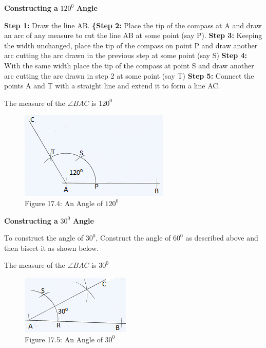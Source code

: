 \documentclass[
  a4paperpaper,
]{scrbook}
\begin{document}
\textbf{Constructing a} \(120^0\) \textbf{Angle}

\textbf{Step 1:} Draw the line AB. \textbf{\{Step 2:} Place the tip of
the compass at A and draw an arc of any measure to cut the line AB at
some point (say P). \textbf{Step 3:} Keeping the width unchanged, place
the tip of the compass on point P and draw another arc cutting the arc
drawn in the previous step at some point (say S) \textbf{Step 4:} With
the same width place the tip of the compass at point S and draw another
arc cutting the arc drawn in step 2 at some point (say T) \textbf{Step
5:} Connect the points A and T with a straight line and extend it to
form a line AC.

The measure of the \(\angle BAC\) is \(120^0\)

\begin{figure}[H]

{\centering \includegraphics{figures/Images/FIG4.png}

}

\caption{Figure 17.4: An Angle of \(120^0\)}

\end{figure}%

\textbf{Constructing a} \(30^0\) \textbf{Angle}

To construct the angle of \(30^0\), Construct the angle of \(60^0\) as
described above and then bisect it as shown below.

The measure of the \(\angle BAC\) is \(30^0\)

\begin{figure}[H]

{\centering \includegraphics{figures/Images/FIG5.png}

}

\caption{Figure 17.5: An Angle of \(30^0\)}

\end{figure}%
\end{document}
